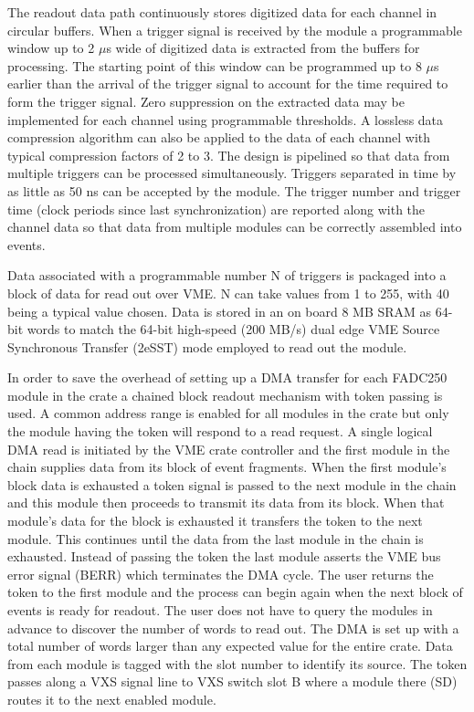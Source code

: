 The readout data path continuously stores digitized data for each channel in circular buffers. When a trigger signal is 
received by the module a programmable window up to 2 $\mu$s wide of digitized data is extracted from the buffers for
processing. The starting point of this window can be programmed up to 8 $\mu$s earlier than the arrival of the trigger
signal to account for the time required to form the trigger signal.  Zero suppression on the extracted data may be 
implemented for each channel using programmable thresholds.  A lossless data compression algorithm can also be applied to the data of each channel with typical compression factors of 2 to 3. The design is pipelined so that data from multiple triggers can be processed simultaneously.  Triggers separated in time by as little as 50 ns can be accepted by the module. The trigger number and trigger time (clock periods since last synchronization) are reported along with the channel data so that data from multiple modules can be correctly assembled into events. 

Data associated with a programmable number N of triggers is packaged into a block of data for read out over VME.  N can take values from 1 to 255, with 40 being a typical value chosen.  Data is stored in an on board 8 MB SRAM as 64-bit words to match the 64-bit high-speed (200 MB/s) dual edge VME Source Synchronous Transfer (2eSST) mode employed to read out the module.  

In order to save the overhead of setting up a DMA transfer for each FADC250 module in the crate a chained block readout mechanism with token passing is used.  A common address range is enabled for all modules in the crate but only the module having the token will respond to a read request.  A single logical DMA read is initiated by the VME crate controller and the first module in the chain supplies data from its block of event fragments.  When the first module’s block data is exhausted a token signal is passed to the next module in the chain and this module then proceeds to transmit its data from its block.  When that module’s data for the block is exhausted it transfers the token to the next module.  This continues until the data from the last module in the chain is exhausted.  Instead of passing the token the last module asserts the VME bus error signal (BERR) which terminates the DMA cycle.  The user returns the token to the first module and the process can begin again when the next block of events is ready for readout.  The user does not have to query the modules in advance to discover the number of words to read out.  The DMA is set up with a total number of words larger than any expected value for the entire crate.  Data from each module is tagged with the slot number to identify its source.  The token passes along a VXS signal line to VXS switch slot B where a module there (SD) routes it to the next enabled module.


